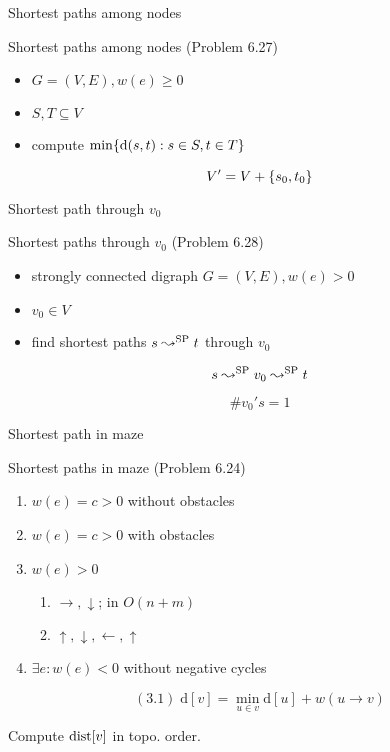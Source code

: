 \begin{frame}{Shortest paths among nodes}
  \begin{exampleblock}{Shortest paths among nodes (Problem 6.27)}
	\begin{itemize}
	  \item $G = (V, E), w(e) \ge 0$ 
	  \item $S, T \subseteq V$
	  \item compute $\min \{\text{d}(s,t): s \in S, t \in T\}$
	\end{itemize}
  \end{exampleblock}

  \[
	V' = V + \{s_0, t_0\}
  \]
\end{frame}
\begin{frame}{Shortest path through $v_0$}
  \begin{exampleblock}{Shortest paths through $v_0$ (Problem 6.28)}
	\begin{itemize}
	  \item strongly connected digraph $G = (V, E), w(e) > 0$
	  \item $v_0 \in V$
	  \item find shortest paths $s \leadsto^{\text{SP}} t$ through $v_0$
	\end{itemize}
  \end{exampleblock}

  \[
	s \leadsto^{\text{SP}} v_0 \leadsto^{\text{SP}} t
  \]

  \[
	\# v_0's = 1
  \]
\end{frame}
\begin{frame}{Shortest path in maze}
  \begin{exampleblock}{Shortest paths in maze (Problem 6.24)}
	\begin{enumerate}
	  \item $w(e) = c > 0$ without obstacles
	  \item $w(e) = c > 0$ with obstacles
	  \item $w(e) > 0$
		\begin{enumerate}
		  \item $\rightarrow, \downarrow$; in $O(n + m)$
		  \item $\uparrow, \downarrow, \leftarrow, \uparrow$
		\end{enumerate}
	  \item $\exists e: w(e) < 0$ without negative cycles
	\end{enumerate}
  \end{exampleblock}

  \[
	(3.1)\; \text{d}[v] = \min_{u \in v} \text{d}[u] + w(u \to v)
  \]

  \centerline{Compute $\text{dist}[v]$ in topo. order.}
\end{frame}
